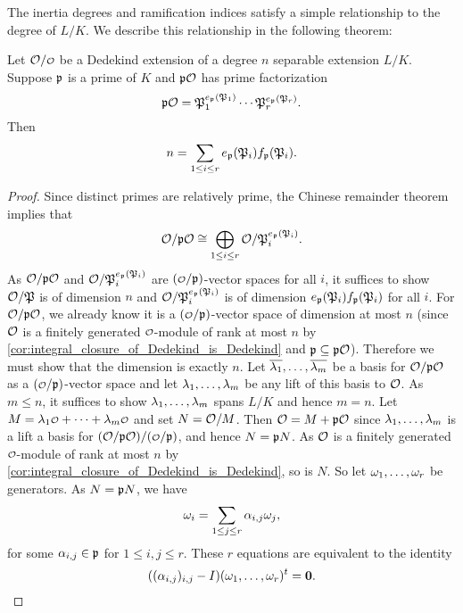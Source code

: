     The inertia degrees and ramification indices satisfy a simple relationship to the degree of $L/K$. We describe this relationship in the following theorem:

    \begin{theorem}\label{prop:inertia_ramification_relation}
      Let $\mc{O}/\smc{O}$ be a Dedekind extension of a degree $n$ separable extension $L/K$. Suppose $\mathfrak{p}$ is a prime of $K$ and $\mathfrak{p}\mathcal{O}$ has prime factorization
      \[
        \mathfrak{p}\mathcal{O} = \mathfrak{P}_{1}^{e_{\mathfrak{p}}(\mathfrak{P}_{1})} \cdots \mathfrak{P}_{r}^{e_{\mathfrak{p}}(\mathfrak{P}_{r})}.
      \]
      Then
      \[
        n = \sum_{1 \le i \le r}e_{\mathfrak{p}}(\mathfrak{P}_{i})f_{\mathfrak{p}}(\mathfrak{P}_{i}).
      \]
    \end{theorem}
    \begin{proof}
      Since distinct primes are relatively prime, the Chinese remainder theorem implies that
      \[
        \mathcal{O}/\mathfrak{p}\mathcal{O} \cong \bigoplus_{1 \le i \le r} \mathcal{O}/\mathfrak{P}_{i}^{e_{\mathfrak{p}}(\mathfrak{P}_{i})}.
      \]
      As $\mathcal{O}/\mathfrak{p}\mathcal{O}$ and $\mathcal{O}/\mathfrak{P}_{i}^{e_{\mathfrak{p}}(\mathfrak{P}_{i})}$ are $(\smc{O}/\mf{p})$-vector spaces for all $i$, it suffices to show $\mathcal{O}/\mathfrak{P}$ is of dimension $n$ and $\mathcal{O}/\mathfrak{P}_{i}^{e_{\mathfrak{p}}(\mathfrak{P}_{i})}$ is of dimension $e_{\mathfrak{p}}(\mathfrak{P}_{i})f_{\mathfrak{p}}(\mathfrak{P}_{i})$ for all $i$. For $\mathcal{O}/\mathfrak{p}\mathcal{O}$, we already know it is a $(\smc{O}/\mf{p})$-vector space of dimension at most $n$ (since $\mathcal{O}$ is a finitely generated $\smc{O}$-module of rank at most $n$ by \cref{cor:integral_closure_of_Dedekind_is_Dedekind} and $\mathfrak{p} \subseteq \mathfrak{p}\mathcal{O}$). Therefore we must show that the dimension is exactly $n$. Let $\overline{\lambda_{1}},\ldots,\overline{\lambda_{m}}$ be a basis for $\mathcal{O}/\mathfrak{p}\mathcal{O}$ as a $(\smc{O}/\mf{p})$-vector space and let $\lambda_{1},\ldots,\lambda_{m}$ be any lift of this basis to $\mathcal{O}$. As $m \le n$, it suffices to show $\lambda_{1},\ldots,\lambda_{m}$ spans $L/K$ and hence $m = n$. Let $M = \l_{1}\smc{O}+\cdots+\l_{m}\smc{O}$ and set $N = \mathcal{O}/M$. Then $\mathcal{O} = M+\mathfrak{p}\mathcal{O}$ since $\lambda_{1},\ldots,\lambda_{m}$ is a lift a basis for $(\mc{O}/\mf{p}\mc{O})/(\smc{O}/\mf{p})$, and hence $N = \mathfrak{p}N$. As $\mathcal{O}$ is a finitely generated $\smc{O}$-module of rank at most $n$ by \cref{cor:integral_closure_of_Dedekind_is_Dedekind}, so is $N$. So let $\omega_{1},\ldots,\omega_{r}$ be generators. As $N = \mathfrak{p}N$, we have
      \[
        \omega_{i} = \sum_{1 \le j \le r}\alpha_{i,j}\omega_{j},
      \]
      for some $\alpha_{i,j} \in \mathfrak{p}$ for $1 \le i,j \le r$. These $r$ equations are equivalent to the identity
      \[
        ((\alpha_{i,j})_{i,j}-I)(\omega_{1},\ldots,\omega_{r})^{t} = \mathbf{0}.
\]
\end{proof}
